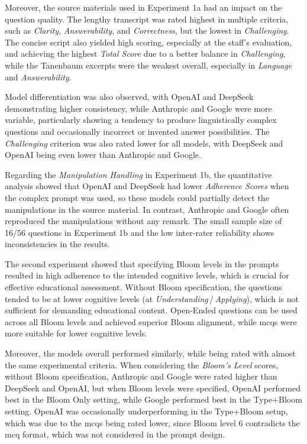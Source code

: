 Moreover, the source materials used in Experiment 1a had an impact on the question quality. The lengthy transcript was rated highest in multiple criteria, such as \textit{Clarity}, \textit{Answerability}, and \textit{Correctness}, but the lowest in \textit{Challenging}. The concise script also yielded high scoring, especially at the staff's evaluation, and achieving the highest \textit{Total Score} due to a better balance in \textit{Challenging}, while the Tanenbaum excerpts were the weakest overall, especially in \textit{Language} and \textit{Answerability}.

Model differentiation was also observed, with OpenAI and DeepSeek demonstrating higher consistency, while Anthropic and Google were more variable, particularly showing a tendency to produce linguistically complex questions and occasionally incorrect or invented answer possibilities. The \textit{Challenging} criterion was also rated lower for all models, with DeepSeek and OpenAI being even lower than Anthropic and Google. 

Regarding the \textit{Manipulation Handling} in Experiment 1b, the quantitative analysis showed that OpenAI and DeepSeek had lower \textit{Adherence Scores} when the complex prompt was used, so these models could partially detect the manipulations in the source material. In contrast, Anthropic and Google often reproduced the manipulations without any remark. The small sample size of 16/56 questions in Experiment 1b and the low inter-rater reliability shows inconsistencies in the results.

The second experiment showed that specifying Bloom levels in the prompts resulted in high adherence to the intended cognitive levels, which is crucial for effective educational assessment. Without Bloom specification, the questions tended to be at lower cognitive levels (at \textit{Understanding}\,/\,\textit{Applying}), which is not sufficient for demanding educational content. Open-Ended questions can be used across all Bloom levels and achieved superior Bloom alignment, while \acp{mcq} were more suitable for lower cognitive levels. 

Moreover, the models overall performed similarly, while being rated with almost the same experimental criteria. When considering the \textit{Bloom's Level} scores, without Bloom specification, Anthropic and Google were rated higher than DeepSeek and OpenAI, but when Bloom levels were specified, OpenAI performed best in the Bloom Only setting, while Google performed best in the Type+Bloom setting. OpenAI was occasionally underperforming in the Type+Bloom setup, which was due to the \acp{mcq} being rated lower, since Bloom level 6 contradicts the \ac{mcq} format, which was not considered in the prompt design.

